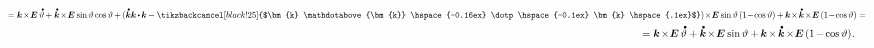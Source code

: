 \begin{otherlanguage}{russian}
\begin{multline*}
%
\scalebox{0.78}[0.82]{$= \bm{k} \hspace{-0.24ex}\times\hspace{-0.4ex} \bm{E} \hspace{0.4ex} \mathdotabove{\vartheta} \hspace{-0.1ex}
+ \mathdotabove{\bm{k}} \hspace{-0.24ex}\times\hspace{-0.4ex} \bm{E} \hspace{.1ex} \operatorname{sin} \vartheta \operatorname{cos} \vartheta \hspace{-0.1ex}
+ \hspace{-0.16ex} ( \mathdotabove{\bm{k}} \bm{k} \hspace{-0.1ex} \dotp \hspace{-0.16ex} \bm{k} \hspace{-0.1ex} - \tikzbackcancel[black!25]{$\bm{k} \mathdotabove{\bm{k}} \hspace{-0.16ex} \dotp \hspace{-0.1ex} \bm{k} \hspace{.1ex}$} ) \hspace{-0.4ex}\times\hspace{-0.4ex} \bm{E} \hspace{.1ex} \operatorname{sin} \vartheta \left({1 \!-\! \operatorname{cos} \vartheta}\right) \hspace{-0.1ex}
+ \hspace{-0.1ex} \bm{k} \hspace{-0.32ex}\times\hspace{-0.25ex}  \mathdotabove{\bm{k}} \hspace{-0.25ex}\times\hspace{-0.42ex} \bm{E} \hspace{.32ex} ({1 \!-\! \operatorname{cos} \vartheta}) = $} \\
%
\shoveright{\hfill \hspace{11.2em}\scalebox{.96}[.96]{$= \bm{k} \hspace{-0.24ex}\times\hspace{-0.4ex} \bm{E} \hspace{0.4ex} \mathdotabove{\vartheta}
+ \mathdotabove{\bm{k}} \hspace{-0.24ex}\times\hspace{-0.4ex} \bm{E} \hspace{.1ex} \operatorname{sin} \vartheta
+ \hspace{-0.1ex} \bm{k} \hspace{-0.2ex}\times\hspace{-0.2ex}  \mathdotabove{\bm{k}} \hspace{-0.2ex}\times\hspace{-0.4ex} \bm{E} \hspace{.32ex} ({1 \hspace{-0.2ex} - \hspace{-0.2ex} \operatorname{cos} \vartheta}) \hspace{.1ex}.
$}}
\end{multline*}


\end{otherlanguage}
